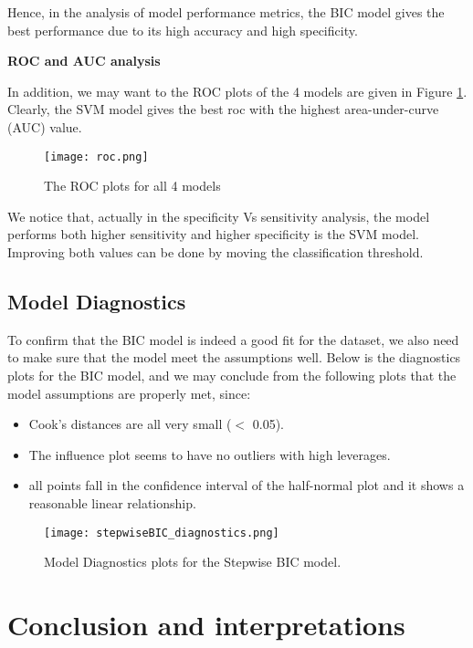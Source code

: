 \documentclass[11pt]{article}
\begin{document}
Hence, in the analysis of model performance metrics, the BIC model gives the best performance due to its high accuracy and high specificity. 


\textbf{ROC and AUC analysis}

In addition, we may want to the ROC plots of the 4 models are given in Figure \ref{fig:roc}. Clearly, the SVM model gives the best roc with the highest area-under-curve (AUC) value. 

\begin{figure}[h]
    \centering
    \texttt{[image: roc.png]}
    \caption{The ROC plots for all 4 models}
    \label{fig:roc}
\end{figure}


We notice that, actually in the specificity Vs sensitivity analysis, the model performs both higher sensitivity and higher specificity is the SVM model. Improving both values can be done by moving the classification threshold. 

\subsection{Model Diagnostics}

To confirm that the BIC model is indeed a good fit for the dataset, we also need to make sure that the model meet the assumptions well. Below is the diagnostics plots for the BIC model, and we may conclude from the following plots that the model assumptions are properly met, since: 

\begin{itemize}
    \item Cook's distances are all very small ($<$ 0.05). 
    \item The influence plot seems to have no outliers with high leverages. 
    \item all points fall in the confidence interval of the half-normal plot and it shows a reasonable linear relationship. 
\end{itemize}

\begin{figure}[h]
    \centering
    \texttt{[image: stepwiseBIC\_diagnostics.png]}
    \caption{Model Diagnostics plots for the Stepwise BIC model. }
    \label{fig:BICdiagnostics}
\end{figure}

\section{Conclusion and interpretations} 
\end{document}
